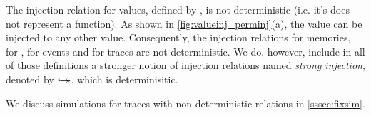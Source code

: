 The injection relation for values, defined by \compcert,  is not deterministic (i.e. it's does not represent a function). As shown in \autoref{fig:valueinj_perminj}(a), the value  can be injected to any other value. Consequently, the injection relations for memories, for , for events and for traces are not deterministic. We do, however, include in all of those definitions a stronger notion of injection relations named \emph{strong injection}, denoted by $\overset{}{\hookrightarrow\mathrel{\mspace{-15mu}}\rightarrow}$, which is determinisitic. 

We discuss simulations for traces with non deterministic relations in \autoref{sssec:fixsim}. 